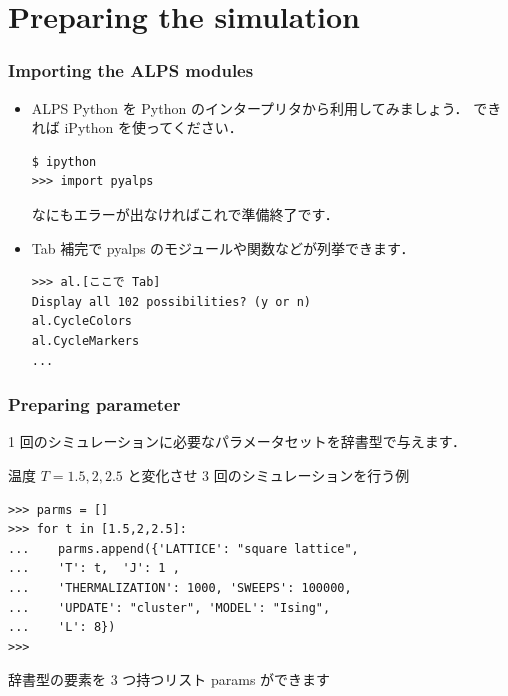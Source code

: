 \section{Preparing the simulation}
\begin{frame}[t,fragile]
 \frametitle{Importing the ALPS modules}

\begin{itemize}
 \item ALPS Python を Python のインタープリタから利用してみましょう．
       できれば iPython を使ってください．
       
       \begin{lstlisting}
$ ipython
>>> import pyalps
       \end{lstlisting}
       なにもエラーが出なければこれで準備終了です．


 \item Tab 補完で pyalps のモジュールや関数などが列挙できます．

       \begin{lstlisting}
>>> al.[ここで Tab]
Display all 102 possibilities? (y or n)
al.CycleColors   
al.CycleMarkers  
...            
       \end{lstlisting}
\end{itemize}
 
\end{frame}


\begin{frame}[t,fragile]
\frametitle{Preparing parameter}

1 回のシミュレーションに必要なパラメータセットを辞書型で与えます．


温度 $T = 1.5, 2, 2.5$ と変化させ 3 回のシミュレーションを行う例

\begin{lstlisting}
>>> parms = []
>>> for t in [1.5,2,2.5]:
...    parms.append({'LATTICE': "square lattice", 
...    'T': t,  'J': 1 ,
...    'THERMALIZATION': 1000, 'SWEEPS': 100000,
...    'UPDATE': "cluster", 'MODEL': "Ising",
...    'L': 8})
>>>
\end{lstlisting}

辞書型の要素を 3 つ持つリスト params ができます

\end{frame}

